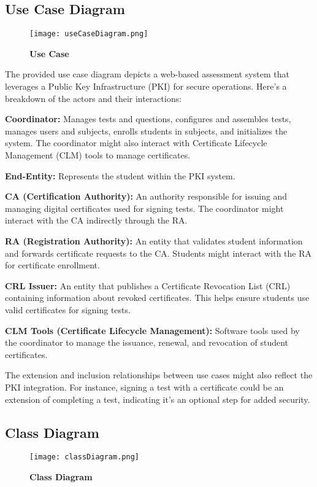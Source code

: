 \documentclass[10pt]{report}
\begin{document}
\subsection{Use Case Diagram}
\begin{figure}[H]
\centering
\texttt{[image: useCaseDiagram.png]}
\caption{\textbf{Use Case}}
\end{figure}
The provided use case diagram depicts a web-based assessment system that leverages a Public Key Infrastructure (PKI) for secure operations. Here's a breakdown of the actors and their interactions:



\textbf{Coordinator:}  Manages tests and questions, configures and assembles tests, manages users and subjects, enrolls students in subjects, and initializes the system. The coordinator might also interact with Certificate Lifecycle Management (CLM) tools to manage certificates.

\textbf{End-Entity:}  Represents the student within the PKI system.

\textbf{CA (Certification Authority):}  An authority responsible for issuing and managing digital certificates used for signing tests. The coordinator might interact with the CA indirectly through the RA.

\textbf{RA (Registration Authority):}  An entity that validates student information and forwards certificate requests to the CA. Students might interact with the RA for certificate enrollment.

\textbf{CRL Issuer:}  An entity that publishes a Certificate Revocation List (CRL) containing information about revoked certificates. This helps ensure students use valid certificates for signing tests.

\textbf{CLM Tools (Certificate Lifecycle Management):}  Software tools used by the coordinator to manage the issuance, renewal, and revocation of student certificates.

The extension and inclusion relationships between use cases might also reflect the PKI integration. For instance, signing a test with a certificate could be an extension of completing a test, indicating it's an optional step for added security.


\subsection{Class Diagram}
\begin{figure}[H]
\centering
\texttt{[image: classDiagram.png]}
\caption{\textbf{Class Diagram}}
\end{figure}
\end{document}
